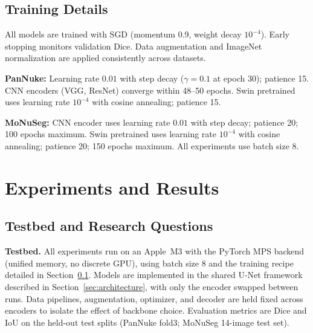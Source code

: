 \documentclass{article}
\begin{document}
\subsection{Training Details}
\label{sec:training_details}

All models are trained with SGD (momentum 0.9, weight decay $10^{-4}$). Early stopping monitors validation Dice. Data augmentation and ImageNet normalization are applied consistently across datasets.

\textbf{PanNuke:} Learning rate $0.01$ with step decay ($\gamma = 0.1$ at epoch 30); patience 15. CNN encoders (VGG, ResNet) converge within 48--50 epochs. Swin pretrained uses learning rate $10^{-4}$ with cosine annealing; patience 15.

\textbf{MoNuSeg:} CNN encoder uses learning rate $0.01$ with step decay; patience 20; 100 epochs maximum. Swin pretrained uses learning rate $10^{-4}$ with cosine annealing; patience 20; 150 epochs maximum. All experiments use batch size 8.

\section{Experiments and Results}
\label{sec:experiments}

\subsection{Testbed and Research Questions}

\textbf{Testbed.} All experiments run on an Apple~M3 with the PyTorch MPS backend (unified memory, no discrete GPU), using batch size 8 and the training recipe detailed in Section~\ref{sec:training_details}. Models are implemented in the shared U-Net framework described in Section~\ref{sec:architecture}, with only the encoder swapped between runs. Data pipelines, augmentation, optimizer, and decoder are held fixed across encoders to isolate the effect of backbone choice. Evaluation metrics are Dice and IoU on the held-out test splits (PanNuke fold3; MoNuSeg 14-image test set).
\end{document}
